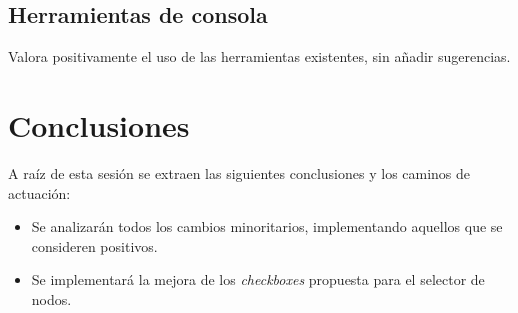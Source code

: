 \subsection{Herramientas de consola}

Valora positivamente el uso de las herramientas existentes, sin añadir sugerencias.

\section{Conclusiones}

A raíz de esta sesión se extraen las siguientes conclusiones y los caminos de actuación:

\begin{itemize}
	\item Se analizarán todos los cambios minoritarios, implementando aquellos que se consideren positivos.
	\item Se implementará la mejora de los \textit{checkboxes} propuesta para el selector de nodos.
\end{itemize}


